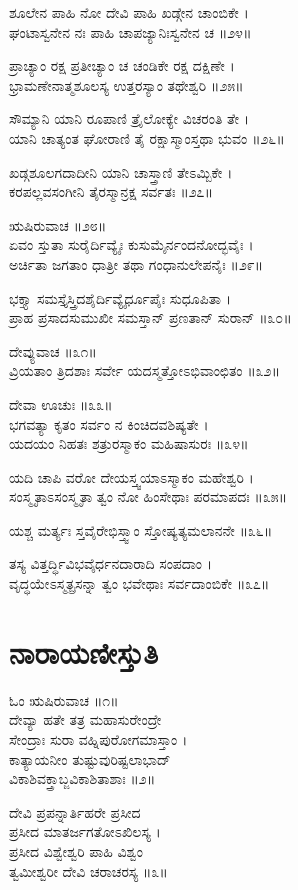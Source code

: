 ಶೂಲೇನ ಪಾಹಿ ನೋ ದೇವಿ ಪಾಹಿ ಖಡ್ಗೇನ ಚಾಂಬಿಕೇ ।\\
ಘಂಟಾಸ್ವನೇನ ನಃ ಪಾಹಿ ಚಾಪಜ್ಯಾನಿಃಸ್ವನೇನ ಚ ॥೨೪॥

ಪ್ರಾಚ್ಯಾಂ ರಕ್ಷ ಪ್ರತೀಚ್ಯಾಂ ಚ ಚಂಡಿಕೇ ರಕ್ಷ ದಕ್ಷಿಣೇ ।\\
ಭ್ರಾಮಣೇನಾತ್ಮಶೂಲಸ್ಯ ಉತ್ತರಸ್ಯಾಂ ತಥೇಶ್ವರಿ ॥೨೫॥

ಸೌಮ್ಯಾನಿ ಯಾನಿ ರೂಪಾಣಿ ತ್ರೈಲೋಕ್ಯೇ ವಿಚರಂತಿ ತೇ ।\\
ಯಾನಿ ಚಾತ್ಯಂತ ಘೋರಾಣಿ ತೈ ರಕ್ಷಾಸ್ಮಾಂಸ್ತಥಾ ಭುವಂ ॥೨೬॥

ಖಡ್ಗಶೂಲಗದಾದೀನಿ ಯಾನಿ ಚಾಸ್ತ್ರಾಣಿ ತೇಽಮ್ಬಿಕೇ ।\\
ಕರಪಲ್ಲವಸಂಗೀನಿ ತೈರಸ್ಮಾನ್ರಕ್ಷ ಸರ್ವತಃ ॥೨೭॥

 ಋಷಿರುವಾಚ ॥೨೮॥\\
ಏವಂ ಸ್ತುತಾ ಸುರೈರ್ದಿವ್ಯೈಃ ಕುಸುಮೈರ್ನಂದನೋದ್ಭವೈಃ ।\\
ಅರ್ಚಿತಾ ಜಗತಾಂ ಧಾತ್ರೀ ತಥಾ ಗಂಧಾನುಲೇಪನೈಃ ॥೨೯॥

ಭಕ್ತ್ಯಾ ಸಮಸ್ತೈಸ್ತ್ರಿದಶೈರ್ದಿವ್ಯೈರ್ಧೂಪೈಃ ಸುಧೂಪಿತಾ ।\\
ಪ್ರಾಹ ಪ್ರಸಾದಸುಮುಖೀ ಸಮಸ್ತಾನ್ ಪ್ರಣತಾನ್ ಸುರಾನ್ ॥೩೦॥

ದೇವ್ಯುವಾಚ ॥೩೧॥\\
ವ್ರಿಯತಾಂ ತ್ರಿದಶಾಃ ಸರ್ವೇ ಯದಸ್ಮತ್ತೋಽಭಿವಾಂಛಿತಂ ॥೩೨॥

ದೇವಾ ಊಚುಃ ॥೩೩॥\\
ಭಗವತ್ಯಾ ಕೃತಂ ಸರ್ವಂ ನ ಕಿಂಚಿದವಶಿಷ್ಯತೇ ।\\
ಯದಯಂ ನಿಹತಃ ಶತ್ರುರಸ್ಮಾಕಂ ಮಹಿಷಾಸುರಃ ॥೩೪॥

ಯದಿ ಚಾಪಿ ವರೋ ದೇಯಸ್ತ್ವಯಾಽಸ್ಮಾಕಂ ಮಹೇಶ್ವರಿ ।\\
ಸಂಸ್ಮೃತಾಽಸಂಸ್ಮೃತಾ ತ್ವಂ ನೋ ಹಿಂಸೇಥಾಃ ಪರಮಾಪದಃ ॥೩೫॥

ಯಶ್ಚ ಮರ್ತ್ಯಃ ಸ್ತವೈರೇಭಿಸ್ತ್ವಾಂ ಸ್ತೋಷ್ಯತ್ಯಮಲಾನನೇ ॥೩೬॥

ತಸ್ಯ ವಿತ್ತರ್ದ್ಧಿವಿಭವೈರ್ಧನದಾರಾದಿ ಸಂಪದಾಂ ।\\
ವೃದ್ಧಯೇಽಸ್ಮತ್ಪ್ರಸನ್ನಾ ತ್ವಂ ಭವೇಥಾಃ ಸರ್ವದಾಂಬಿಕೇ ॥೩೭॥


\section{ನಾರಾಯಣೀಸ್ತುತಿ}
ಓಂ ಋಷಿರುವಾಚ ॥೧॥\\
ದೇವ್ಯಾ ಹತೇ ತತ್ರ ಮಹಾಸುರೇಂದ್ರೇ\\
        ಸೇಂದ್ರಾಃ ಸುರಾ ವಹ್ನಿಪುರೋಗಮಾಸ್ತಾಂ ।\\
ಕಾತ್ಯಾಯನೀಂ ತುಷ್ಟುವುರಿಷ್ಟಲಾಭಾದ್\\
      ವಿಕಾಶಿವಕ್ತ್ರಾಬ್ಜವಿಕಾಶಿತಾಶಾಃ ॥೨॥

ದೇವಿ ಪ್ರಪನ್ನಾರ್ತಿಹರೇ ಪ್ರಸೀದ\\
        ಪ್ರಸೀದ ಮಾತರ್ಜಗತೋಽಖಿಲಸ್ಯ ।\\
ಪ್ರಸೀದ ವಿಶ್ವೇಶ್ವರಿ ಪಾಹಿ ವಿಶ್ವಂ\\
        ತ್ವಮೀಶ್ವರೀ ದೇವಿ ಚರಾಚರಸ್ಯ ॥೩॥

